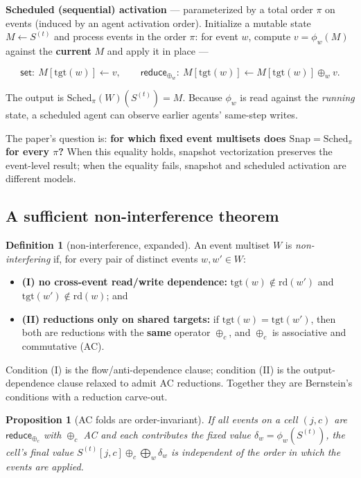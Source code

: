 \documentclass[sigconf,nonacm,review,natbib=true]{acmart}
\newtheorem{proposition}{Proposition}
\theoremstyle{definition}
\newtheorem{definition}{Definition}
\theoremstyle{plain}
\theoremstyle{remark}
\begin{document}
\textbf{Scheduled (sequential) activation} --- parameterized by a total order $\pi$ on events (induced by an agent activation order). Initialize a mutable state $M\leftarrow S^{(t)}$ and process events in the order $\pi$: for event $w$, compute $v=\phi_w(M)$ against the \textbf{current} $M$ and apply it in place ---

\[
\textsf{set}:\ M[\mathrm{tgt}(w)]\leftarrow v,\qquad
\textsf{reduce}_{\oplus_w}:\ M[\mathrm{tgt}(w)]\leftarrow M[\mathrm{tgt}(w)]\oplus_w v .
\]

The output is $\mathrm{Sched}_\pi(W)(S^{(t)})=M$. Because $\phi_w$ is read against the \emph{running} state, a scheduled agent can observe earlier agents' same-step writes.

The paper's question is: \textbf{for which fixed event multisets does
$\mathrm{Snap}=\mathrm{Sched}_\pi$ for every $\pi$?} When this equality holds,
snapshot vectorization preserves the event-level result; when the equality
fails, snapshot and scheduled activation are different models.


\subsection{A sufficient non-interference theorem}\label{ax:char}

\begin{definition}[non-interference, expanded]\label{def:noninterference-full} An event multiset $W$ is \emph{non-interfering} if, for every pair of distinct events $w,w'\in W$:

\begin{itemize}
\item \textbf{(I) no cross-event read/write dependence:}
$\mathrm{tgt}(w)\notin\mathrm{rd}(w')$ and
$\mathrm{tgt}(w')\notin\mathrm{rd}(w)$; and
\item \textbf{(II) reductions only on shared targets:} if
$\mathrm{tgt}(w)=\mathrm{tgt}(w')$, then both are reductions with the
\textbf{same} operator $\oplus_c$, and $\oplus_c$ is associative and
commutative (AC).
\end{itemize}

Condition (I) is the flow/anti-dependence clause; condition (II) is the output-dependence clause relaxed to admit AC reductions. Together they are Bernstein's conditions with a reduction carve-out.

\end{definition}

\begin{proposition}[AC folds are order-invariant]\label{prop:acfold}
If all events on a cell $(j,c)$ are $\textsf{reduce}_{\oplus_c}$ with $\oplus_c$ AC and each contributes the fixed value $\delta_w=\phi_w(S^{(t)})$, the cell's final value $S^{(t)}[j,c]\oplus_c\bigoplus_w\delta_w$ is independent of the order in which the events are applied.
\end{proposition}
\end{document}
